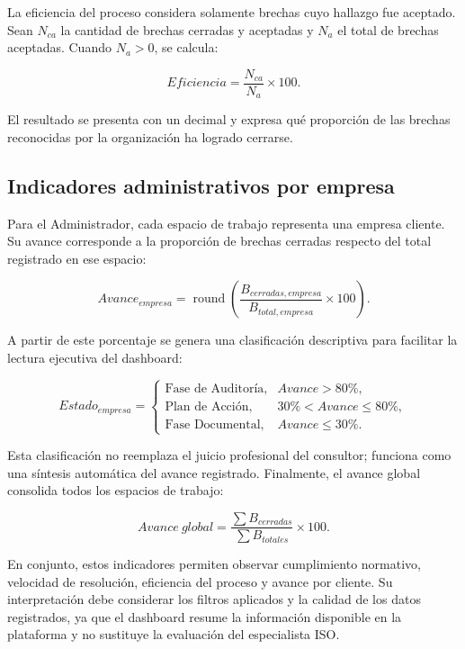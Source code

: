 \documentclass[final]{udpthesis}
\begin{document}
La eficiencia del proceso considera solamente brechas cuyo hallazgo fue aceptado. Sean $N_{ca}$ la cantidad de brechas cerradas y aceptadas y $N_a$ el total de brechas aceptadas. Cuando $N_a>0$, se calcula:

\begin{equation}
Eficiencia = \frac{N_{ca}}{N_a}\times 100.
\label{eq:eficiencia-proceso}
\end{equation}

El resultado se presenta con un decimal y expresa qué proporción de las brechas reconocidas por la organización ha logrado cerrarse.

\subsection{Indicadores administrativos por empresa}

Para el Administrador, cada espacio de trabajo representa una empresa cliente. Su avance corresponde a la proporción de brechas cerradas respecto del total registrado en ese espacio:

\begin{equation}
Avance_{empresa} =
\operatorname{round}\left(\frac{B_{cerradas,empresa}}
{B_{total,empresa}}\times 100\right).
\label{eq:avance-empresa}
\end{equation}

A partir de este porcentaje se genera una clasificación descriptiva para facilitar la lectura ejecutiva del dashboard:

\begin{equation}
Estado_{empresa}=
\begin{cases}
\text{Fase de Auditoría}, & Avance>80\%,\\
\text{Plan de Acción}, & 30\%<Avance\leq80\%,\\
\text{Fase Documental}, & Avance\leq30\%.
\end{cases}
\label{eq:fase-empresa}
\end{equation}

Esta clasificación no reemplaza el juicio profesional del consultor; funciona como una síntesis automática del avance registrado. Finalmente, el avance global consolida todos los espacios de trabajo:

\begin{equation}
Avance\ global =
\frac{\sum B_{cerradas}}{\sum B_{totales}}\times 100.
\label{eq:avance-global}
\end{equation}

En conjunto, estos indicadores permiten observar cumplimiento normativo, velocidad de resolución, eficiencia del proceso y avance por cliente. Su interpretación debe considerar los filtros aplicados y la calidad de los datos registrados, ya que el dashboard resume la información disponible en la plataforma y no sustituye la evaluación del especialista ISO.
\end{document}
